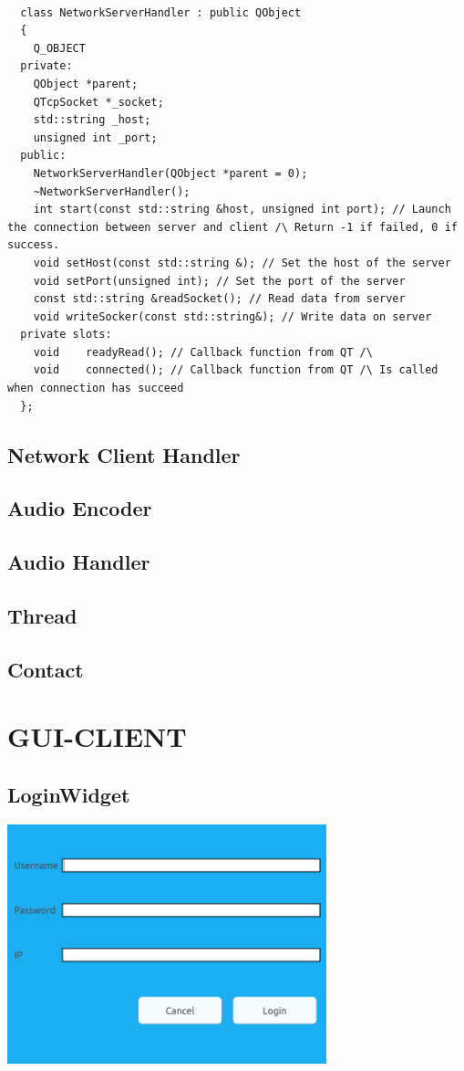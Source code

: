 \documentclass{article}
\begin{document}
\begin{lstlisting}

  class NetworkServerHandler : public QObject
  {
    Q_OBJECT
  private:
    QObject *parent;
    QTcpSocket *_socket;
    std::string _host;
    unsigned int _port;
  public:
    NetworkServerHandler(QObject *parent = 0);
    ~NetworkServerHandler();
    int start(const std::string &host, unsigned int port); // Launch the connection between server and client /\ Return -1 if failed, 0 if success.
    void setHost(const std::string &); // Set the host of the server
    void setPort(unsigned int); // Set the port of the server
    const std::string &readSocket(); // Read data from server
    void writeSocker(const std::string&); // Write data on server
  private slots:
    void	readyRead(); // Callback function from QT /\
    void	connected(); // Callback function from QT /\ Is called when connection has succeed
  };

\end{lstlisting}
\newpage
\subsection{Network Client Handler}
\subsection{Audio Encoder}
\subsection{Audio Handler}
\subsection{Thread}
\subsection{Contact}
\newpage
\section{GUI-CLIENT}

\subsection{LoginWidget}
  \includegraphics[width=350]{LoginWidget}
  \newpage
\end{document}
